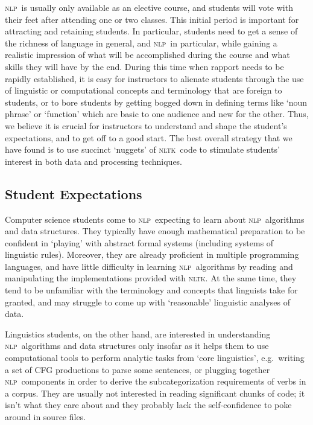 \documentclass[11pt]{article}
\newcommand{\NLP}{\textsc{nlp}}
\newcommand{\NLTK}{\textsc{nltk}}
\begin{document}
\NLP\ is usually only available as an elective course, and students
will vote with their feet after attending one or two classes.  This
initial period is important for attracting and retaining students.  In
particular, students need to get a sense of the richness of language
in general, and \NLP\ in particular, while gaining a realistic
impression of what will be accomplished during the course and what
skills they will have by the end.  During this time when rapport needs
to be rapidly established, it is easy for instructors to alienate
students through the use of linguistic or computational concepts and
terminology that are foreign to students, or to bore students by
getting bogged down in defining terms like `noun phrase' or `function'
which are basic to one audience and new for the other.  Thus, we
believe it is crucial for instructors to understand and shape the
student's expectations, and to get off to a good start.  The best
overall strategy that we have found is to use succinct `nuggets' of
\NLTK\ code to stimulate students' interest in both data and
processing techniques.

\subsection{Student Expectations}

Computer science students come to \NLP\ expecting to learn about \NLP\
algorithms and data structures.  They typically have enough
mathematical preparation to be confident in `playing' with abstract
formal systems (including systems of linguistic rules).  Moreover,
they are already proficient in multiple programming languages, and
have little difficulty in learning \NLP\ algorithms by reading and
manipulating the implementations provided with \NLTK. At the same
time, they tend to be unfamiliar with the terminology and concepts
that linguists take for granted, and may struggle to come up with
`reasonable' linguistic analyses of data.

Linguistics students, on the other hand, are interested in
understanding \NLP\ algorithms and data structures only insofar as it helps them
to use computational tools to perform analytic tasks from `core linguistics',
e.g.\ writing a set of CFG productions to parse some sentences, or
plugging together \NLP\ components in order to derive the subcategorization
requirements of verbs in a corpus.
They are usually not interested in reading significant chunks of code;
it isn't what they care about and they
probably lack the self-confidence to poke around in source files.
\end{document}
